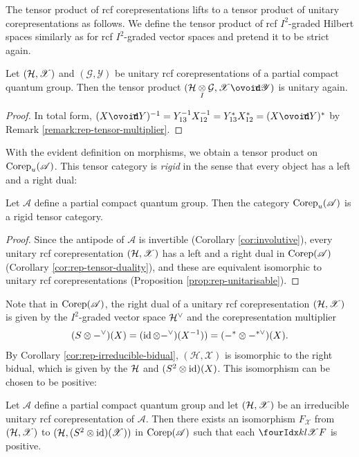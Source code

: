 The tensor product of rcf corepresentations lifts to a tensor product
of unitary corepresentations as follows.  We define the tensor product
of rcf $I^{2}$-graded Hilbert spaces similarly as for rcf
$I^{2}$-graded vector spaces and pretend it to be strict again.
\begin{Lem}\label{lemma:rep-unitary-tensor}
  Let $(\mathcal{H},\mathscr{X})$ and $(\mathcal{G},\mathscr{Y})$ be unitary
  rcf corepresentations of a partial compact quantum group. Then the
  tensor product $(\Hsp \itimes \mathcal{G},\mathscr{X} \Circt
  \mathscr{Y})$ is unitary again.
\end{Lem}
\begin{proof}
In total form,  $(X\Circt Y)^{-1} = Y_{13}^{-1}X_{12}^{-1}
  =Y_{13}^{*}X_{12}^{*} = (X \Circt Y)^{*}$ by Remark \ref{remark:rep-tensor-multiplier}.
\end{proof}
With the evident definition on morphisms, we obtain a tensor product
on $\mathrm{Corep}_{u}(\mathscr{A})$.  This tensor
category is \emph{rigid} in the sense that every object has a
left and a right dual:
\begin{Cor}
  Let $\mathscr{A}$ define a partial compact quantum group. Then the
  category $\mathrm{Corep}_{u}(\mathscr{A})$ is a rigid tensor category.
\end{Cor}
\begin{proof}
  Since the antipode of $\mathscr{A}$ is invertible (Corollary
  \ref{cor:involutive}), every unitary rcf corepresentation
  $(\mathcal{H},\mathscr{X})$ has a left and a right dual in
  $\mathrm{Corep}(\mathscr{A})$ (Corollary \ref{cor:rep-tensor-duality}),
  and these are equivalent isomorphic to unitary rcf corepresentations
  (Proposition \ref{prop:rep-unitarisable}).
\end{proof}
Note that in $\mathrm{Corep}(\mathscr{A})$, the right dual of a unitary rcf
corepresentation $(\mathcal{H},\mathscr{X})$ is given by the $I^{2}$-graded
vector space
$\mathcal{H}^{\vee}$  and the corepresentation multiplier
\begin{align} \label{eq:rep-unitary-right-dual}
  (S\otimes -^{\vee})(X) = (\operatorname{id} \otimes -^{\vee})(X^{-1}) )=
  (-^{*}\otimes -^{*\vee})(X).
\end{align}
By Corollary \ref{cor:rep-irreducible-bidual},
$(\mathcal{H},\mathscr{X})$ is isomorphic to the right bidual, which
is given by the $\mathcal{H}$ and $(S^{2} \otimes \operatorname{id})(X)$. This isomorphism can be
chosen to be positive:
\begin{Prop} \label{prop:rep-unitary-bidual}
  Let $\mathscr{A}$ define a partial compact quantum group and let
  $(\mathcal{H},\mathscr{X})$ be an irreducible unitary rcf corepresentation of
  $\mathscr{A}$.  Then there exists an isomorphism $F_{\mathscr{X}}$
  from $(\mathcal{H},\mathscr{X})$ to 
  $(\mathcal{H},(S^{2} \otimes \operatorname{id})(\mathscr{X}))$ in $\mathrm{Corep}(\mathscr{A})$ such
  that each $\Gr{F}{k}{l}{}{\mathscr{X}}$ is positive.
\end{Prop}
